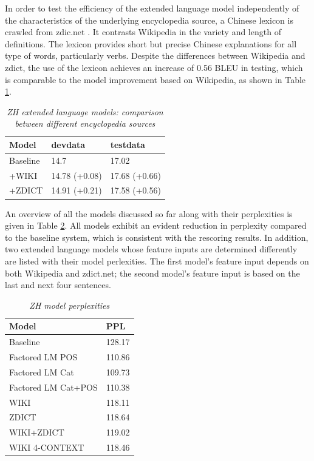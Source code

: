 \documentclass[a4paper]{article}
\begin{document}
In order to test the efficiency of the extended language model independently of the characteristics of the underlying encyclopedia  source, a Chinese lexicon is crawled from zdic.net \cite{zdic}. It contrasts Wikipedia in the variety and length of definitions. The lexicon provides short but precise Chinese explanations for all type of words, particularly verbs. Despite the differences between Wikipedia and zdict, the use of the lexicon achieves an increase of 0.56 BLEU in testing, which is comparable to the
model improvement based on Wikipedia, as shown in Table \ref{tb:zh-extended-diff-sources}.

\begin{table}
\caption{\it ZH extended language models: comparison between different encyclopedia sources}
\vspace{2mm}
\centering
  \begin{tabular}{lll}
  	\hline
  	Model    & devdata       & testdata      \\ \hline\hline
  	Baseline & 14.7          & 17.02         \\ \hline
  	+WIKI    & 14.78 (+0.08) & 17.68 (+0.66) \\
  	+ZDICT    & 14.91 (+0.21) & 17.58 (+0.56) \\ \hline
  \end{tabular}
  \label{tb:zh-extended-diff-sources}
\end{table}

An overview of all the models discussed so far along with their perplexities is given in Table \ref{tb:PPL}. All models exhibit an evident reduction in perplexity compared to the baseline system, which is consistent with the rescoring results. In addition, two extended language models whose feature inputs are determined differently are listed with their model perlexities. The first model's feature input depends on both Wikipedia and zdict.net; the second model's feature input is based on the last and next four sentences.

\begin{table}
  \caption{\it ZH model perplexities}
  \vspace{2mm}
  \centering
  \begin{tabular}{ ll}
  	\hline
  	Model               & PPL    \\ \hline\hline
  	Baseline            & 128.17 \\ \hline
  	Factored LM POS     & 110.86 \\
  	Factored LM Cat     & 109.73 \\
  	Factored LM Cat+POS & 110.38 \\ \hline
  	WIKI                & 118.11 \\
  	ZDICT               & 118.64 \\ 
  	WIKI+ZDICT			& 119.02 \\ 
	WIKI 4-CONTEXT		& 118.46 \\ \hline
  \end{tabular}
  \label{tb:PPL}
\end{table}
\end{document}

